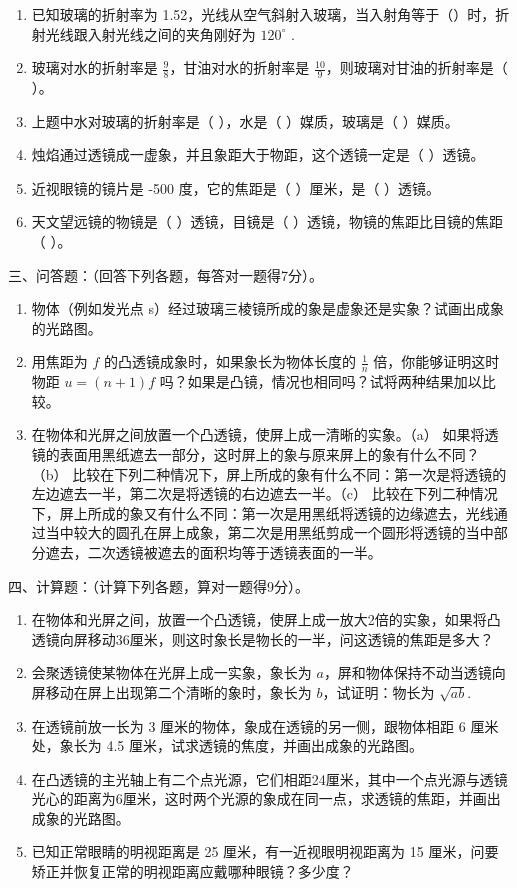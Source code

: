 \begin{enumerate}
\item
  已知玻璃的折射率为
  1.52，光线从空气斜射入玻璃，当入射角等于（）时，折射光线跟入射光线之间的夹角刚好为
  \(120^{\circ}\) .
\item
  玻璃对水的折射率是 \(\frac{9}{8}\)，甘油对水的折射率是
  \(\frac{10}{9}\)，则玻璃对甘油的折射率是（ ）。
\item
  上题中水对玻璃的折射率是（ ），水是（ ）媒质，玻璃是（ ）媒质。
\item
  烛焰通过透镜成一虚象，并且象距大于物距，这个透镜一定是（ ）透镜。
\item
  近视眼镜的镜片是 -500 度，它的焦距是（ ）厘米，是（ ）透镜。
\item
  天文望远镜的物镜是（ ）透镜，目镜是（ ）透镜，物镜的焦距比目镜的焦距（
  ）。
\end{enumerate}

三、问答题：（回答下列各题，每答对一题得7分）。

\begin{enumerate}
\item
  物体（例如发光点
  s）经过玻璃三棱镜所成的象是虚象还是实象？试画出成象的光路图。
\item
  用焦距为 \(f\) 的凸透镜成象时，如果象长为物体长度的 \(\frac{1}{n}\)
  倍，你能够证明这时物距 \(u = (n + 1)f\)
  吗？如果是凸镜，情况也相同吗？试将两种结果加以比较。
\item
  在物体和光屏之间放置一个凸透镜，使屏上成一清晰的实象。（a）
  如果将透镜的表面用黑纸遮去一部分，这时屏上的象与原来屏上的象有什么不同？（b）
  比较在下列二种情况下，屏上所成的象有什么不同：第一次是将透镜的左边遮去一半，第二次是将透镜的右边遮去一半。（c）
  比较在下列二种情况下，屏上所成的象又有什么不同：第一次是用黑纸将透镜的边缘遮去，光线通过当中较大的圆孔在屏上成象，第二次是用黑纸剪成一个圆形将透镜的当中部分遮去，二次透镜被遮去的面积均等于透镜表面的一半。
\end{enumerate}

四、计算题：（计算下列各题，算对一题得9分）。

\begin{enumerate}
\item
  在物体和光屏之间，放置一个凸透镜，使屏上成一放大2倍的实象，如果将凸透镜向屏移动36厘米，则这时象长是物长的一半，问这透镜的焦距是多大？
\item
  会聚透镜使某物体在光屏上成一实象，象长为
  \(a\)，屏和物体保持不动当透镜向屏移动在屏上出现第二个清晰的象时，象长为
  \(b\)，试证明：物长为 \(\sqrt{ab}\).
\item
  在透镜前放一长为 3 厘米的物体，象成在透镜的另一侧，跟物体相距 6
  厘米处，象长为 4.5 厘米，试求透镜的焦度，并画出成象的光路图。
\item
  在凸透镜的主光轴上有二个点光源，它们相距24厘米，其中一个点光源与透镜光心的距离为6厘米，这时两个光源的象成在同一点，求透镜的焦距，并画出成象的光路图。
\item
  已知正常眼睛的明视距离是 25 厘米，有一近视眼明视距离为 15
  厘米，问要矫正并恢复正常的明视距离应戴哪种眼镜？多少度？
\end{enumerate}

